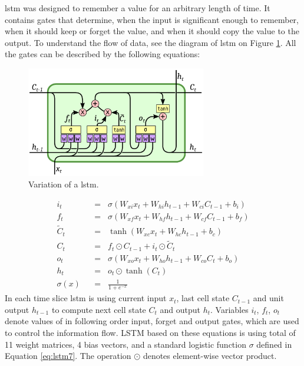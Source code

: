\gls{lstm} was designed to remember a value for an arbitrary length of time. It contains gates that determine, when the input is significant enough to remember, when it should keep or forget the value, and when it should copy the value to the output. To understand the flow of data, see the diagram of \gls{lstm} on Figure \ref{fig:lstm}. All the gates can be described by the following equations:
\begin{figure}[!t]
	\centering
	\includegraphics[width=0.7\textwidth]{./fig/lstm-peepholes.pdf}
	\caption{Variation of a \gls{lstm}.
		\label{fig:lstm}}
\end{figure}
\belowdisplayskip=16pt
\begin{align}
	i_t \hspace{7pt}&=\hspace{7pt} \sigma(W_{xi}x_t + W_{hi}h_{t-1} + W_{ci}C_{t-1} + b_i) \label{eq:lstm1}\\
	f_t \hspace{7pt}&=\hspace{7pt} \sigma(W_{xf}x_t + W_{hf}h_{t-1} + W_{cf}C_{t-1} + b_f) \label{eq:lstm2}\\
	\widetilde{C}_t\hspace{7pt}&=\hspace{7pt} \tanh(W_{xc}x_t + W_{hc}h_{t-1} + b_c) \label{eq:lstm3}\\
	C_t \hspace{7pt}&=\hspace{7pt} f_t\odot C_{t-1} + i_t\odot \widetilde{C}_t \label{eq:lstm4}\\
	o_t \hspace{7pt}&=\hspace{7pt} \sigma(W_{xo}x_t + W_{ho}h_{t-1} + W_{co}C_t + b_o) \label{eq:lstm5}\\
	h_t \hspace{7pt}&=\hspace{7pt} o_t\odot \tanh(C_t) \label{eq:lstm6}\\[16pt]
	\sigma(x) \hspace{7pt}&=\hspace{7pt} \frac{1}{1+e^{-x}} \label{eq:lstm7}
\end{align}
In each time slice \gls{lstm} is using current input $ x_t $, last cell state $ C_{t-1} $ and unit output $ h_{t-1} $ to compute next cell state $ C_t $ and output $ h_t $. Variables $ i_t $, $ f_t $, $ o_t $ denote values of in following order input, forget and output gates, which are used to control the information flow. LSTM based on these equations is using total of 11 weight matrices, 4 bias vectors, and a standard logistic function $ \sigma $ defined in Equation \eqref{eq:lstm7}. The operation $ \odot $ denotes element-wise vector product.

